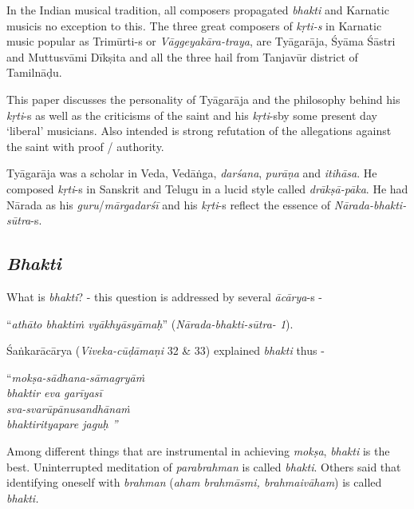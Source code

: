 In the Indian musical tradition, all composers propagated \textit{bhakti} and Karnatic musicis no exception to this\textit{. }The three great composers of \textit{kṛti-s} in Karnatic music popular as Trimūrti-s or \textit{Vāggeyakāra-traya}, are Tyāgarāja, Śyāma Śāstri and Muttusvāmi Dīkṣita and all the three hail from Tanjavūr district of Tamilnāḍu. 

This paper discusses the personality of Tyāgarāja and the philosophy behind his \textit{kṛti}-s as well as the criticisms of the saint and his \textit{kṛti}-s\break by some present day ‘liberal’ musicians. Also intended is strong refutation of the allegations against the saint with proof / authority.

Tyāgarāja was a scholar in Veda, Vedāṅga, \textit{darśana}, \textit{purāṇa} and \textit{itihāsa}. He composed \textit{kṛti}-s in Sanskrit and Telugu in a lucid style called \textit{drākṣā-pāka}. He had Nārada as his \textit{guru}/\textit{mārgadarśī} and his \textit{kṛti}-s reflect the essence of \textit{Nārada-bhakti-sūtra}-s.

\subsection*{\textit{Bhakti}}

What is \textit{bhakti}? - this question is addressed by several \textit{ācārya}-s - 

“\textit{athāto bhaktiṁ vyākhyāsyāmaḥ}” (\textit{Nārada-bhakti-sūtra- 1}).

Śaṅkarācārya (\textit{Viveka-cūḍāmaṇi} 32 \& 33) explained \textit{bhakti} thus -

\begin{centerquote}
“\textit{mokṣa-sādhana-sāmagryāṁ}\\ \textit{bhaktir eva garīyasī }\\ \textit{sva-svarūpānusandhānaṁ}\\ \textit{bhaktirityapare jaguḥ ”}
\end{centerquote}

\newpage

Among different things that are instrumental in achieving \textit{mokṣa}, \textit{bhakti} is the best. Uninterrupted meditation of \textit{parabrahman} is called \textit{bhakti}. Others said that identifying oneself with \textit{brahman} (\textit{aham brahmāsmi, brahmaivāham}) is called \textit{bhakti.}

